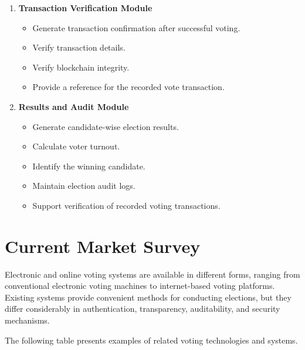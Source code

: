 \documentclass[12pt,a4paper]{report}
\begin{document}
\begin{enumerate}[leftmargin=*, itemsep=4pt]
	\item \textbf{Transaction Verification Module}
	\begin{itemize}
		\item Generate transaction confirmation after successful voting.
		\item Verify transaction details.
		\item Verify blockchain integrity.
		\item Provide a reference for the recorded vote transaction.
	\end{itemize}
	
	\item \textbf{Results and Audit Module}
	\begin{itemize}
		\item Generate candidate-wise election results.
		\item Calculate voter turnout.
		\item Identify the winning candidate.
		\item Maintain election audit logs.
		\item Support verification of recorded voting transactions.
	\end{itemize}
	
\end{enumerate}



\chapter{Current Market Survey}

Electronic and online voting systems are available in different forms, ranging from conventional electronic voting machines to internet-based voting platforms. Existing systems provide convenient methods for conducting elections, but they differ considerably in authentication, transparency, auditability, and security mechanisms.

The following table presents examples of related voting technologies and systems.
\end{document}
